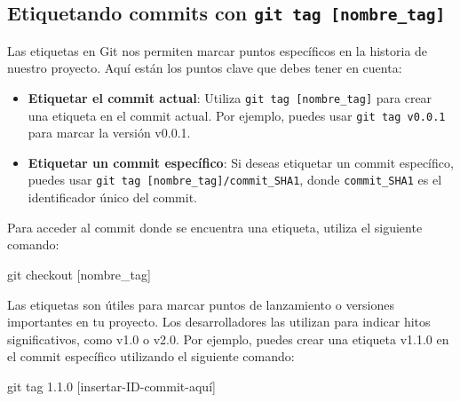 \documentclass[
  letterpaper,
  DIV=11,
  numbers=noendperiod]{scrartcl}
\newenvironment{Shaded}{}{}
\newcommand{\FunctionTok}[1]{\textcolor[rgb]{0.44,0.26,0.76}{#1}}
\newcommand{\NormalTok}[1]{\textcolor[rgb]{0.14,0.16,0.18}{#1}}
\newcommand{\PreprocessorTok}[1]{\textcolor[rgb]{0.84,0.23,0.29}{#1}}
\newcommand{\SpecialStringTok}[1]{\textcolor[rgb]{0.01,0.18,0.38}{#1}}
\begin{document}
\hypertarget{etiquetando-commits-con-git-tag-nombre_tag}{%
\subsection{\texorpdfstring{Etiquetando commits con
\texttt{git\ tag\ {[}nombre\_tag{]}}}{Etiquetando commits con git tag {[}nombre\_tag{]}}}\label{etiquetando-commits-con-git-tag-nombre_tag}}

Las etiquetas en Git nos permiten marcar puntos específicos en la
historia de nuestro proyecto. Aquí están los puntos clave que debes
tener en cuenta:

\begin{itemize}
\item
  \textbf{Etiquetar el commit actual}: Utiliza
  \texttt{git\ tag\ {[}nombre\_tag{]}} para crear una etiqueta en el
  commit actual. Por ejemplo, puedes usar \texttt{git\ tag\ v0.0.1} para
  marcar la versión v0.0.1.
\item
  \textbf{Etiquetar un commit específico}: Si deseas etiquetar un commit
  específico, puedes usar
  \texttt{git\ tag\ {[}nombre\_tag{]}/commit\_SHA1}, donde
  \texttt{commit\_SHA1} es el identificador único del commit.
\end{itemize}

Para acceder al commit donde se encuentra una etiqueta, utiliza el
siguiente comando:

\begin{Shaded}
\begin{Highlighting}[]
\FunctionTok{git}\NormalTok{ checkout }\PreprocessorTok{[}\SpecialStringTok{nombre\_tag}\PreprocessorTok{]}
\end{Highlighting}
\end{Shaded}

Las etiquetas son útiles para marcar puntos de lanzamiento o versiones
importantes en tu proyecto. Los desarrolladores las utilizan para
indicar hitos significativos, como v1.0 o v2.0. Por ejemplo, puedes
crear una etiqueta v1.1.0 en el commit específico utilizando el
siguiente comando:

\begin{Shaded}
\begin{Highlighting}[]
\FunctionTok{git}\NormalTok{ tag 1.1.0 }\PreprocessorTok{[}\SpecialStringTok{insertar}\PreprocessorTok{{-}}\SpecialStringTok{ID}\PreprocessorTok{{-}}\SpecialStringTok{commit}\PreprocessorTok{{-}}\SpecialStringTok{aquí}\PreprocessorTok{]}
\end{Highlighting}
\end{Shaded}
\end{document}
